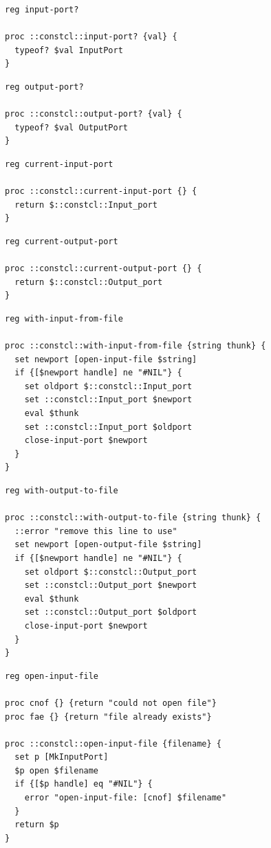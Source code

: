 \documentclass[twoside,9pt]{report}
\begin{document}
\noindent\makebox[\linewidth]{\rule{\linewidth}{0.4pt}}
\noindent\makebox[\linewidth]{\rule{\linewidth}{0.4pt}}
\begin{lstlisting}
reg input-port?
 
proc ::constcl::input-port? {val} {
  typeof? $val InputPort
}
\end{lstlisting}
\noindent\makebox[\linewidth]{\rule{\linewidth}{0.4pt}}
\noindent\makebox[\linewidth]{\rule{\linewidth}{0.4pt}}
\begin{lstlisting}
reg output-port?
 
proc ::constcl::output-port? {val} {
  typeof? $val OutputPort
}
\end{lstlisting}
\noindent\makebox[\linewidth]{\rule{\linewidth}{0.4pt}}
\noindent\makebox[\linewidth]{\rule{\linewidth}{0.4pt}}
\begin{lstlisting}
reg current-input-port
 
proc ::constcl::current-input-port {} {
  return $::constcl::Input_port
}
\end{lstlisting}
\noindent\makebox[\linewidth]{\rule{\linewidth}{0.4pt}}
\noindent\makebox[\linewidth]{\rule{\linewidth}{0.4pt}}
\begin{lstlisting}
reg current-output-port
 
proc ::constcl::current-output-port {} {
  return $::constcl::Output_port
}
\end{lstlisting}
\noindent\makebox[\linewidth]{\rule{\linewidth}{0.4pt}}
\noindent\makebox[\linewidth]{\rule{\linewidth}{0.4pt}}
\begin{lstlisting}
reg with-input-from-file
 
proc ::constcl::with-input-from-file {string thunk} {
  set newport [open-input-file $string]
  if {[$newport handle] ne "#NIL"} {
    set oldport $::constcl::Input_port
    set ::constcl::Input_port $newport
    eval $thunk
    set ::constcl::Input_port $oldport
    close-input-port $newport
  }
}
\end{lstlisting}
\noindent\makebox[\linewidth]{\rule{\linewidth}{0.4pt}}
\noindent\makebox[\linewidth]{\rule{\linewidth}{0.4pt}}
\begin{lstlisting}
reg with-output-to-file
 
proc ::constcl::with-output-to-file {string thunk} {
  ::error "remove this line to use"
  set newport [open-output-file $string]
  if {[$newport handle] ne "#NIL"} {
    set oldport $::constcl::Output_port
    set ::constcl::Output_port $newport
    eval $thunk
    set ::constcl::Output_port $oldport
    close-input-port $newport
  }
}
\end{lstlisting}
\noindent\makebox[\linewidth]{\rule{\linewidth}{0.4pt}}
\noindent\makebox[\linewidth]{\rule{\linewidth}{0.4pt}}
\begin{lstlisting}
reg open-input-file
 
proc cnof {} {return "could not open file"}
proc fae {} {return "file already exists"}
 
proc ::constcl::open-input-file {filename} {
  set p [MkInputPort]
  $p open $filename
  if {[$p handle] eq "#NIL"} {
    error "open-input-file: [cnof] $filename"
  }
  return $p
}
\end{lstlisting}
\end{document}
